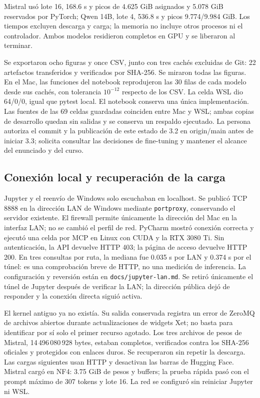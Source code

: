 \documentclass[11pt,letterpaper]{article}
\renewcommand{\_}{\originalunderscore\allowbreak}
\begin{document}
Mistral usó lote 16, 168.6 s y picos de 4.625 GiB asignados y 5.078 GiB
reservados por PyTorch; Qwen 14B, lote 4, 536.8 s y picos 9.774/9.984 GiB.
Los tiempos excluyen descarga y carga; la memoria no incluye otros
procesos ni el controlador. Ambos modelos residieron completos en GPU
y se liberaron al terminar.

Se exportaron ocho figuras y once CSV, junto con tres cachés excluidas
de Git: 22 artefactos transferidos y verificados por SHA-256. Se miraron
todas las figuras. En el Mac, las funciones del notebook reprodujeron
las 30 filas de cada modelo desde sus cachés, con tolerancia $10^{-12}$
respecto de los CSV. La celda WSL dio 64/0/0, igual que pytest local.
El notebook conserva una única implementación. Las fuentes de las 69
celdas guardadas coinciden entre Mac y WSL; ambas copias de desarrollo
quedan sin salidas y se conserva un respaldo ejecutado. La persona autoriza
el commit y la publicación de este estado de 3.2 en origin/main antes de
iniciar 3.3; solicita consultar las decisiones de fine-tuning y mantener
el alcance del enunciado y del curso.

\subsection{Conexión local y recuperación de la carga}
Jupyter y el reenvío de Windows solo escuchaban en localhost. Se publicó
TCP 8888 en la dirección LAN de Windows mediante \texttt{portproxy},
conservando el servidor existente. El firewall permite únicamente la
dirección del Mac en la interfaz LAN; no se cambió el perfil de red.
PyCharm mostró conexión correcta y ejecutó una celda por MCP en Linux
con CUDA y la RTX 3080 Ti. Sin autenticación, la API devuelve HTTP 403;
la página de acceso devuelve HTTP 200. En tres consultas por ruta,
la mediana fue 0.035 s por LAN y 0.374 s por el túnel: es una comprobación
breve de HTTP, no una medición de inferencia. La configuración y reversión
están en \texttt{docs/jupyter-lan.md}.
Se retiró únicamente el túnel de Jupyter después de verificar la LAN;
la dirección pública dejó de responder y la conexión directa siguió activa.

El kernel antiguo ya no existía. Su salida conservada registra un error
de ZeroMQ de archivos abiertos durante actualizaciones de widgets Xet;
no basta para identificar por sí solo el primer recurso agotado. Los tres
archivos de pesos de Mistral, 14\,496\,080\,928 bytes, estaban completos,
verificados contra los SHA-256 oficiales y protegidos con enlaces duros.
Se recuperaron sin repetir la descarga. Las cargas siguientes usan HTTP
y desactivan las barras de Hugging Face. Mistral cargó en NF4: 3.75 GiB
de pesos y buffers; la prueba rápida pasó con el prompt máximo de 307
tokens y lote 16. La red se configuró sin reiniciar Jupyter ni WSL.
\end{document}
